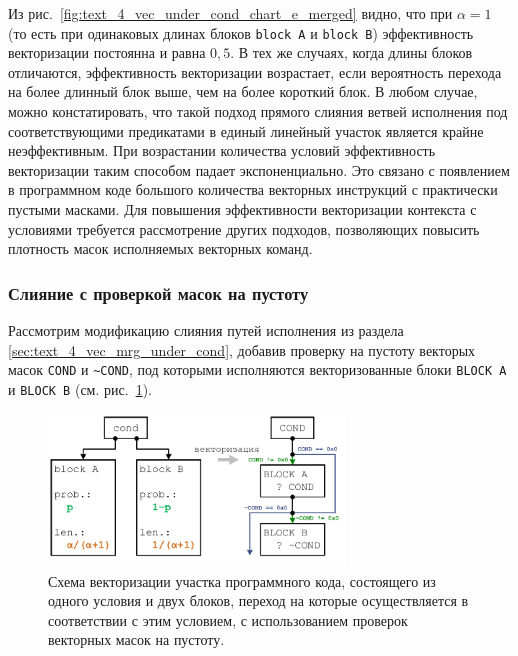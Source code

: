 Из рис.~\ref{fig:text_4_vec_under_cond_chart_e_merged} видно, что при $\alpha = 1$ (то есть при одинаковых длинах блоков \texttt{block A} и \texttt{block B}) эффективность векторизации постоянна и равна $0,5$.
В тех же случаях, когда длины блоков отличаются, эффективность векторизации возрастает, если вероятность перехода на более длинный блок выше, чем на более короткий блок.
В любом случае, можно констатировать, что такой подход прямого слияния ветвей исполнения под соответствующими предикатами в единый линейный участок является крайне неэффективным.
При возрастании количества условий эффективность векторизации таким способом падает экспоненциально.
Это связано с появлением в программном коде большого количества векторных инструкций с практически пустыми масками.
Для повышения эффективности векторизации контекста с условиями требуется рассмотрение других подходов, позволяющих повысить плотность масок исполняемых векторных команд.

\subsubsection{Слияние с проверкой масок на пустоту}\label{sec:text_4_vec_check_mask}

Рассмотрим модификацию слияния путей исполнения из раздела \ref{sec:text_4_vec_mrg_under_cond}, добавив проверку на пустоту векторых масок \texttt{COND} и \texttt{\textasciitilde COND}, под которыми исполняются векторизованные блоки \texttt{BLOCK A} и \texttt{BLOCK B} \cite{Rybakov2024VecComb} (см. рис.~\ref{fig:text_4_vec_check_mask_cond}). 

\begin{figure}[ht]
\centering
\includegraphics[width=0.7\textwidth]{./fig/vec_ifconv_check.pdf}
\singlespacing
{}\caption{Схема векторизации участка программного кода, состоящего из одного условия и двух блоков, переход на которые осуществляется в соответствии с этим условием, с использованием проверок \\ векторных масок на пустоту.}
\label{fig:text_4_vec_check_mask_cond}
\end{figure}

